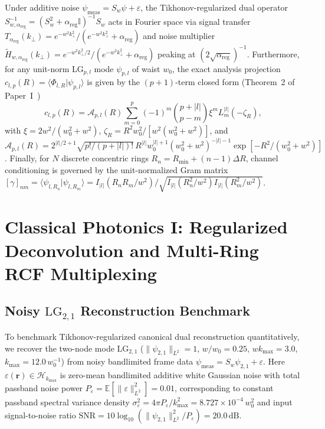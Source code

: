 \documentclass[aps,pra,reprint,nofootinbib,floatfix,longbibliography]{revtex4-2}
\newcommand{\braket}[2]{\langle #1 | #2 \rangle}
\newcommand{\norm}[1]{\lVert #1 \rVert}
\newcommand{\abs}[1]{\lvert #1 \rvert}
\begin{document}
Under additive noise $\psi_{\mathrm{meas}} = S_w\psi + \varepsilon$, the Tikhonov-regularized dual operator $S_{w,\alpha_{\mathrm{reg}}}^{-1} = (S_w^2 + \alpha_{\mathrm{reg}}\mathbb{I})^{-1}S_w$ acts in Fourier space via signal transfer $T_{\alpha_{\mathrm{reg}}}(k_\perp) = e^{-w^2 k_\perp^2}/(e^{-w^2 k_\perp^2}+\alpha_{\mathrm{reg}})$ and noise multiplier $\widetilde{H}_{w,\alpha_{\mathrm{reg}}}(k_\perp) = e^{-w^2 k_\perp^2/2}/(e^{-w^2 k_\perp^2}+\alpha_{\mathrm{reg}})$ peaking at $(2\sqrt{\alpha_{\mathrm{reg}}})^{-1}$. Furthermore, for any unit-norm $\mathrm{LG}_{p,l}$ mode $\psi_{p,l}$ of waist $w_0$, the exact analysis projection $c_{l,p}(R) = \braket{\Phi_{l,R}}{\psi_{p,l}}$ is given by the $(p+1)$-term closed form (Theorem~2 of Paper~I~\cite{AyalaPaperI})
\begin{equation}
c_{l,p}(R) = \mathcal{A}_{p,l}(R) \sum_{m=0}^p (-1)^m \binom{p+\abs{l}}{p-m} \xi^m L_m^{\abs{l}}(-\zeta_R),
\label{eq:c_lp_recap}
\end{equation}
with $\xi = 2w^2/(w_0^2+w^2)$, $\zeta_R = R^2 w_0^2/[w^2(w_0^2+w^2)]$, and $\mathcal{A}_{p,l}(R) = 2^{\abs{l}/2+1}\sqrt{p!/(p+\abs{l})!}\,\allowbreak R^{\abs{l}}w_0^{\abs{l}+1}(w_0^2+w^2)^{-\abs{l}-1}\allowbreak \exp[-R^2/(w_0^2+w^2)]$. Finally, for $N$ discrete concentric rings $R_n = R_{\min} + (n-1)\Delta R$, channel conditioning is governed by the unit-normalized Gram matrix $[\gamma]_{nm} = \braket{\psi_{l,R_n}}{\psi_{l,R_m}} = \allowbreak I_{\abs{l}}(R_n R_m/w^2)/\allowbreak \sqrt{I_{\abs{l}}(R_n^2/w^2)I_{\abs{l}}(R_m^2/w^2)}$.

\section{Classical Photonics I: Regularized Deconvolution and Multi-Ring RCF Multiplexing}
\label{sec:classical_sdm}

\subsection{Noisy \texorpdfstring{$\mathrm{LG}_{2,1}$}{LG\_\{2,1\}} Reconstruction Benchmark}
\label{subsec:noisy_lg21}

To benchmark Tikhonov-regularized canonical dual reconstruction quantitatively, we recover the two-node mode $\mathrm{LG}_{2,1}$ ($\norm{\psi_{2,1}}_{L^2} = 1$, $w/w_0 = 0.25$, $w k_{\max} = 3.0$, $k_{\max} = 12.0\,w_0^{-1}$) from noisy bandlimited frame data $\psi_{\mathrm{meas}} = S_w\psi_{2,1} + \varepsilon$. Here $\varepsilon(\mathbf{r}) \in \mathcal{H}_{k_{\max}}$ is zero-mean bandlimited additive white Gaussian noise with total passband noise power $P_\varepsilon = \mathbb{E}[\norm{\varepsilon}_{L^2}^2] = 0.01$, corresponding to constant passband spectral variance density $\sigma_\varepsilon^2 = 4\pi P_\varepsilon/k_{\max}^2 = 8.727\times 10^{-4}\,w_0^2$ and input signal-to-noise ratio $\mathrm{SNR} = 10\log_{10}(\norm{\psi_{2,1}}_{L^2}^2/P_\varepsilon) = 20.0\,\mathrm{dB}$.
\end{document}
